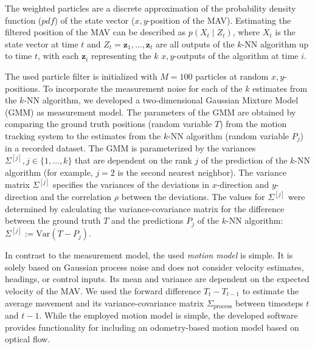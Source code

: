 \documentclass[11pt]{report}
\begin{document}
The weighted particles are a discrete approximation of the probability
density function ($pdf$) of the state vector ($x,y$-position of the
MAV). Estimating the filtered position of the MAV can be described as
$p(X_t \mid Z_t)$, where $X_t$ is the state vector at time $t$ and
$Z_t = \mathbf{z}_1, ..., \mathbf{z}_t$ are all outputs of the $k$-NN
algorithm up to time $t$, with each $\mathbf{z}_i$ representing the
$k$ $x,y$-outputs of the algorithm at time $i$.


The used particle filter is initialized with $M = 100$ particles at
random $x, y$-positions. To incorporate the measurement noise for each
of the $k$ estimates from the $k$-NN algorithm, we developed a
two-dimensional Gaussian Mixture Model (GMM) as measurement model. The
parameters of the GMM are obtained by comparing the ground truth
positions (random variable $T$) from the motion tracking system to the
estimates from the $k$-NN algorithm (random variable $P_j$) in a
recorded dataset. The GMM is parameterized by the
variances~$\Sigma^{[j]}, j \in \{1, \ldots, k\}$ that are dependent on the
rank $j$ of the prediction of the $k$-NN algorithm (for example,
$j = 2$ is the second nearest neighbor).
The variance matrix $\Sigma^{[j]}$ specifies the variances of the
deviations in $x$-direction and $y$-direction and the correlation
$\rho$ between the deviations.
The values for $\Sigma^{[j]}$ were determined by calculating the
variance-covariance matrix for the difference between the ground truth
$T$ and the predictions $P_j$ of the $k$-NN algorithm:
$\Sigma^{[j]} := \text{Var}(T-P_j)$.

In contrast to the measurement model, the used \emph{motion model} is
simple. It is solely based on Gaussian process noise and does not
consider velocity estimates, headings, or control inputs. Its mean and
variance are dependent on the expected velocity of the MAV. We used
the forward difference $T_t - T_{t-1}$ to estimate the average
movement and its variance-covariance matrix $\Sigma_{\text{process}}$
between timesteps $t$ and $t-1$. While the employed motion model is
simple, the developed software provides functionality for including an
odometry-based motion model based on optical flow.
\end{document}

